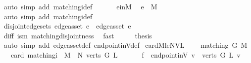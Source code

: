 \begin{isabellebody}
\ {\isacharparenleft}auto\ simp\ add{\isacharcolon}\ matching{\isacharunderscore}i{\isacharunderscore}def{\isacharparenright}\isanewline
\ \ \isamarkupfalse%
\isanewline
\ \ \isamarkupfalse%
\ e{}{\isacharunderscore}in{\isacharunderscore}M{}\ \isamarkupfalse%
\ {\isachardoublequoteopen}e{}\ {\isasymin}\ M{\isachardoublequoteclose}\ \isamarkupfalse%
\ {\isacharparenleft}auto\ simp\ add{\isacharcolon}\ matching{\isacharunderscore}i{\isacharunderscore}def{\isacharparenright}\isanewline
\ \ \isamarkupfalse%
\isanewline
\ \ \isamarkupfalse%
\ disjoint{\isacharunderscore}edge{\isacharunderscore}sets{\isacharcolon}\ {\isachardoublequoteopen}edge{\isacharunderscore}as{\isacharunderscore}set\ e{}\ {\isasyminter}\ edge{\isacharunderscore}as{\isacharunderscore}set\ e{}\ {\isacharequal}\ {\isacharbraceleft}{\isacharbraceright}{\isachardoublequoteclose}\ \isanewline
\ \ \ \ \isamarkupfalse%
\ diff\ is{\isacharunderscore}m\ matching{\isacharunderscore}disjointness\ \isamarkupfalse%
\ fast\isanewline
\ \ \isamarkupfalse%
\ \isamarkupfalse%
\ {\isacharquery}thesis\ \isamarkupfalse%
\ {\isacharparenleft}auto\ simp\ add{\isacharcolon}\ edge{\isacharunderscore}as{\isacharunderscore}set{\isacharunderscore}def\ endpoint{\isacharunderscore}inV{\isacharunderscore}def{\isacharparenright}\isanewline
{}\isamarkupfalse%
%
\endisatagproof
{\isafoldproof}%
%
\isadelimproof
\isanewline
%
\endisadelimproof
\isanewline
{}\isamarkupfalse%
\ card{\isacharunderscore}M{}{\isacharunderscore}le{\isacharunderscore}NVL{}{\isacharcolon}\ \isanewline
\ \ \ {\isachardoublequoteopen}matching\ G\ M{\isachardoublequoteclose}\isanewline
\ \ \ {\isachardoublequoteopen}card\ {\isacharparenleft}matching{\isacharunderscore}i\ {}\ M{\isacharparenright}\ {\isasymle}\ N\ {\isacharparenleft}verts\ G{\isacharparenright}\ L\ {}{\isachardoublequoteclose}\isanewline
%
\isadelimproof
%
\endisadelimproof
%
\isatagproof
{}\isamarkupfalse%
\ {\isacharminus}\isanewline
\ \ \isamarkupfalse%
\ {\isacharquery}f\ {\isacharequal}\ {\isachardoublequoteopen}endpoint{\isacharunderscore}inV\ {\isacharbraceleft}v\ {\isasymin}\ verts\ G{\isachardot}\ L\ v\ {\isacharequal}\ {}{\isacharbraceright}{\isachardoublequoteclose}\isanewline

\end{isabellebody}
